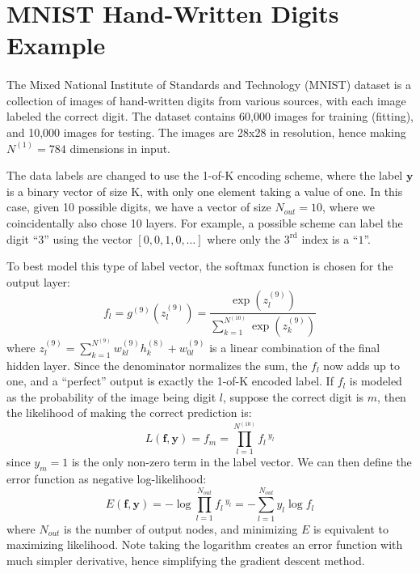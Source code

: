 \section{MNIST Hand-Written Digits Example} \label{sc:MNIST}

\paragraph{}
The Mixed National Institute of Standards and Technology
(MNIST) dataset \cite{Le98} is a collection of images of hand-written digits
from various sources,
with each image labeled the correct digit.
The dataset contains 60,000 images for training (fitting),
and 10,000 images for testing.
The images are 28x28 in resolution,
hence making $N^{(1)} = 784$ dimensions in input.

The data labels are changed to use the 1-of-K encoding scheme,
where the label $\mathbf{y}$ is a binary vector of size K,
with only one element taking a value of one.
In this case, given 10 possible digits,
we have a vector of size $N_{out} = 10$,
where we coincidentally also chose 10 layers.
For example, a possible scheme can label the digit ``$3$'' 
using the vector $[0,0,1,0,\ldots]$ where 
only the $3^\text{rd}$ index is a ``$1$''.

To best model this type of label vector,
the softmax function is chosen for the output layer:
%
\begin{equation*}
	f_l = 
	g^{(9)}(z_l^{(9)}) = \frac{\exp(z_l^{(9)})}
		{\sum_{k=1}^{N^{(10)}} \exp(z_k^{(9)})}
\end{equation*}
%
where $z^{(9)}_l = \sum_{k=1}^{N^{(9)}} w_{kl}^{(9)} h_k^{(8)} + 
      w^{(9)}_{0l}$ 
      is a linear combination of the final hidden layer.
Since the denominator normalizes the sum, the $f_l$ now adds up to one,
and a ``perfect'' output is exactly the 1-of-K encoded label.
If $f_l$ is modeled as the probability of the image being digit $l$,
suppose the correct digit is $m$,
then the likelihood of making the correct prediction is:
%
\begin{equation*}
  L(\mathbf{f},\mathbf{y}) = f_m = \prod_{l=1}^{N^{(10)}} f_l \, ^{y_l}
\end{equation*}
%
since $y_m = 1$ is the only non-zero term in the label vector.
We can then define the error function as negative log-likelihood:
%
\begin{equation*}
	E(\mathbf{f},\mathbf{y}) 
		= - \log \prod_{l=1}^{N_{out}} f_l \, ^{y_l}
		= - \sum_{l=1}^{N_{out}} y_l \log f_l
\end{equation*}
%
where $N_{out}$ is the number of output nodes, 
and minimizing $E$ is equivalent to maximizing likelihood.
Note taking the logarithm creates an error function with much
simpler derivative, 
hence simplifying the gradient descent method.

